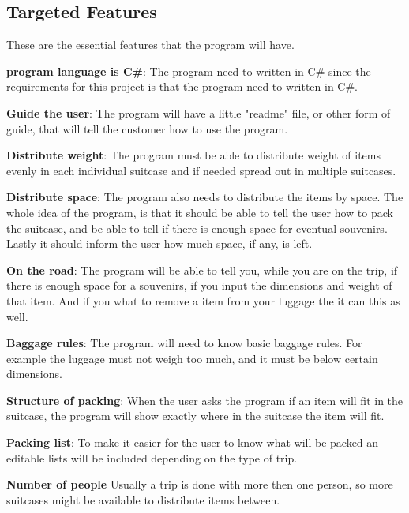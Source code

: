 \subsection{Targeted Features}
These are the essential features that the program will have.\newline

\textbf{program language is C#}:
The program need to written in C# since the requirements for this project is that the program need to written in C#.

\textbf{Guide the user}:
The program will have a little "readme" file, or other form of guide, that will tell the customer how to use the program.
\newline

\textbf{Distribute weight}:
The program must be able to distribute weight of items evenly in each individual suitcase and if needed spread out in multiple suitcases.
\newline

\textbf{Distribute space}:
The program also needs to distribute the items by space. The whole idea of the program, is that it should be able to tell the user how to pack the suitcase, and be able to tell if there is enough space for eventual souvenirs. Lastly it should inform the user how much space, if any, is left.
\newline

\textbf{On the road}:
The program will be able to tell you, while you are on the trip, if there is enough space for a souvenirs, if you input the dimensions and weight of that item. And if you what to remove a item from your luggage the it can this as well.
\newline

\textbf{Baggage rules}:
The program will need to know basic baggage rules. For example the luggage must not weigh too much, and it must be below certain dimensions.
\newline

\textbf{Structure of packing}:
When the user asks the program if an item will fit in the suitcase, the program will show exactly where in the suitcase the item will fit.
\newline

\textbf{Packing list}:
To make it easier for the user to know what will be packed an editable lists will be included depending on the type of trip.
\newline

\textbf{Number of people}
Usually a trip is done with more then one person, so more suitcases might be available to distribute items between.
\newline


